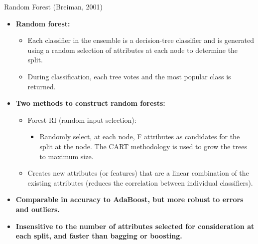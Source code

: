 \begin{frame}{Random Forest (Breiman, 2001)}
	\begin{itemize}
		\item \textbf{Random forest:}
		      \begin{itemize}
			      \item Each classifier in the ensemble is a decision-tree classifier and is generated using a random selection of attributes at each node to determine the split.
			      \item During classification, each tree votes and the most popular class is returned.
		      \end{itemize}
		\item \textbf{Two methods to construct random forests:}
		      \begin{itemize}
			      \item Forest-RI (random input selection):
			            \begin{itemize}
				            \item Randomly select, at each node, F attributes as candidates for the split at the node. The CART methodology is used to grow the trees to maximum size.
			            \end{itemize}
			      \item Creates new attributes (or features) that are a linear combination of the existing attributes (reduces the correlation between individual classifiers).
		      \end{itemize}
		\item \textbf{Comparable in accuracy to AdaBoost, but more robust to errors and outliers.}
		\item \textbf{Insensitive to the number of attributes selected for consideration at each split, and faster than bagging or boosting.}
	\end{itemize}
\end{frame}

